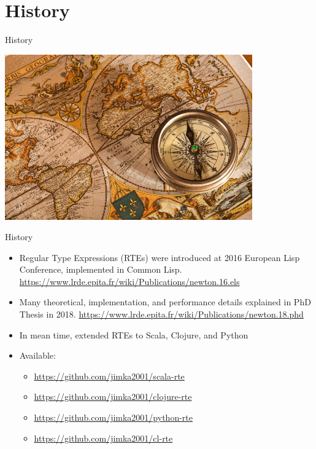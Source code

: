 \section{History}
\begin{frame}{History}
  \centering
  
    \includegraphics[width=0.8\textwidth]{history.jpg}
\end{frame}

\begin{frame}{History}
  \begin{itemize}
  \item Regular Type Expressions (RTEs) were introduced at 2016 European Lisp Conference, implemented in Common Lisp.
    \url{https://www.lrde.epita.fr/wiki/Publications/newton.16.els}
  \item Many theoretical, implementation, and performance details explained in PhD Thesis in 2018.
    \url{https://www.lrde.epita.fr/wiki/Publications/newton.18.phd}
  \item In mean time, extended RTEs to Scala, Clojure, and Python
  \item Available:
    \begin{itemize}
    \item \url{https://github.com/jimka2001/scala-rte}
    \item \url{https://github.com/jimka2001/clojure-rte}
    \item \url{https://github.com/jimka2001/python-rte}
    \item \url{https://github.com/jimka2001/cl-rte}
    \end{itemize}
  \end{itemize}
\end{frame}


